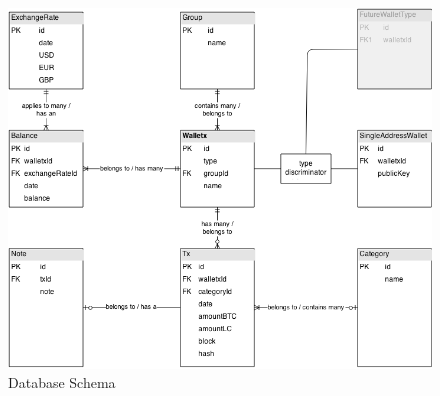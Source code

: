 
\begin{figure}[H]
	\centering
	\includegraphics[scale=0.5]{../diagrams/schema.png}
	\caption{Database Schema}
\end{figure}


